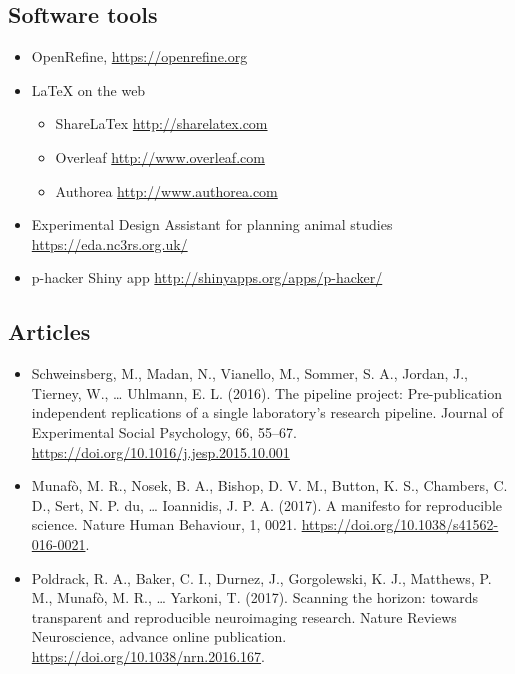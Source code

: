\documentclass[
]{article}
\providecommand{\tightlist}{%
  \setlength{\itemsep}{0pt}\setlength{\parskip}{0pt}}
\begin{document}
\hypertarget{software-tools}{%
\subsection{Software tools}\label{software-tools}}

\begin{itemize}
\tightlist
\item
  OpenRefine, \url{https://openrefine.org}
\item
  LaTeX on the web

  \begin{itemize}
  \tightlist
  \item
    ShareLaTex \url{http://sharelatex.com}
  \item
    Overleaf \url{http://www.overleaf.com}
  \item
    Authorea \url{http://www.authorea.com}
  \end{itemize}
\item
  Experimental Design Assistant for planning animal studies
  \url{https://eda.nc3rs.org.uk/}
\item
  p-hacker Shiny app \url{http://shinyapps.org/apps/p-hacker/}
\end{itemize}

\hypertarget{articles}{%
\subsection{Articles}\label{articles}}

\begin{itemize}
\tightlist
\item
  Schweinsberg, M., Madan, N., Vianello, M., Sommer, S. A., Jordan, J.,
  Tierney, W., \ldots{} Uhlmann, E. L. (2016). The pipeline project:
  Pre-publication independent replications of a single laboratory's
  research pipeline. Journal of Experimental Social Psychology, 66,
  55--67. \url{https://doi.org/10.1016/j.jesp.2015.10.001}
\item
  Munafò, M. R., Nosek, B. A., Bishop, D. V. M., Button, K. S.,
  Chambers, C. D., Sert, N. P. du, \ldots{} Ioannidis, J. P. A. (2017).
  A manifesto for reproducible science. Nature Human Behaviour, 1, 0021.
  \url{https://doi.org/10.1038/s41562-016-0021}.
\item
  Poldrack, R. A., Baker, C. I., Durnez, J., Gorgolewski, K. J.,
  Matthews, P. M., Munafò, M. R., \ldots{} Yarkoni, T. (2017). Scanning
  the horizon: towards transparent and reproducible neuroimaging
  research. Nature Reviews Neuroscience, advance online publication.
  \url{https://doi.org/10.1038/nrn.2016.167}.
\end{itemize}
\end{document}
